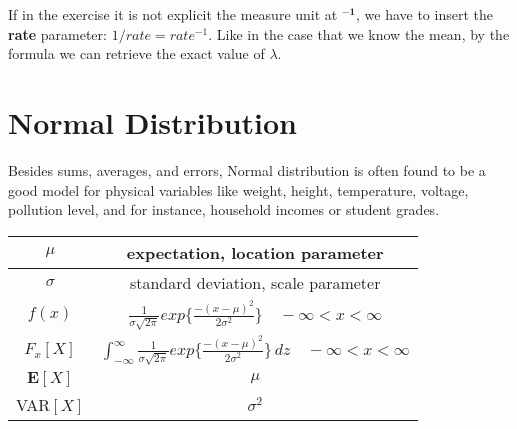 \begin{tcolorbox}
If in the exercise it is not explicit the measure unit at \(\mathbf{^{-1}}\), we have to insert the \textbf{rate} parameter: \(1/rate = rate^{-1}\). Like in the case that we know the mean, by the formula we can retrieve the exact value of $\lambda$.
\end{tcolorbox}

\section{Normal Distribution}
\begin{tcolorbox}
Besides sums, averages, and errors, Normal distribution is often found to be a good model for physical variables like weight, height, temperature, voltage, pollution level, and for instance, household incomes or student grades.
\end{tcolorbox}

\begingroup
\setlength{\tabcolsep}{10pt} %
\renewcommand{\arraystretch}{1.5} %
\begin{center}
\begin{tabular}{ |c|c| } 
\hline
\(\mu\) & expectation, location parameter \\ \hline
\(\sigma\) & standard deviation, scale parameter \\ \hline
\(f(x)\) & $\frac{1}{\sigma \sqrt{2\pi}} exp\Big\{\frac{-(x - \mu)^2}{2\sigma^2}\Big\} \quad -\infty < x < \infty$ \\ \hline
\(F_x[X]\) & $\int_{-\infty}^{\infty} \frac{1}{\sigma \sqrt{2\pi}} exp\Big\{\frac{-(x - \mu)^2}{2\sigma^2}\Big\} \,dz \quad -\infty < x < \infty$ \\ \hline
\(\mathbf{E}[X]\) & \(\mu\) \\ \hline
VAR\([X]\) & \(\sigma^2\) \\ \hline
\end{tabular}
\end{center}
\endgroup

